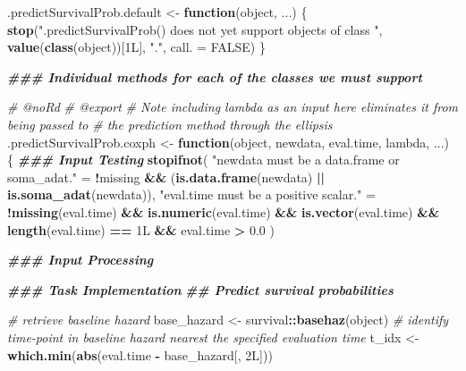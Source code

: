 \documentclass[
]{book}
\newenvironment{Shaded}{\begin{snugshade}}{\end{snugshade}}
\newcommand{\AttributeTok}[1]{\textcolor[rgb]{0.13,0.29,0.53}{#1}}
\newcommand{\CommentTok}[1]{\textcolor[rgb]{0.56,0.35,0.01}{\textit{#1}}}
\newcommand{\ConstantTok}[1]{\textcolor[rgb]{0.56,0.35,0.01}{#1}}
\newcommand{\ControlFlowTok}[1]{\textcolor[rgb]{0.13,0.29,0.53}{\textbf{#1}}}
\newcommand{\DocumentationTok}[1]{\textcolor[rgb]{0.56,0.35,0.01}{\textbf{\textit{#1}}}}
\newcommand{\FloatTok}[1]{\textcolor[rgb]{0.00,0.00,0.81}{#1}}
\newcommand{\FunctionTok}[1]{\textcolor[rgb]{0.13,0.29,0.53}{\textbf{#1}}}
\newcommand{\NormalTok}[1]{#1}
\newcommand{\OtherTok}[1]{\textcolor[rgb]{0.56,0.35,0.01}{#1}}
\newcommand{\SpecialCharTok}[1]{\textcolor[rgb]{0.81,0.36,0.00}{\textbf{#1}}}
\newcommand{\StringTok}[1]{\textcolor[rgb]{0.31,0.60,0.02}{#1}}
\begin{document}
\begin{Shaded}
\begin{Highlighting}[]
\NormalTok{.predictSurvivalProb.default }\OtherTok{\textless{}{-}} \ControlFlowTok{function}\NormalTok{(object, ...) \{}
  \FunctionTok{stop}\NormalTok{(}\StringTok{"\textasciigrave{}.predictSurvivalProb()\textasciigrave{} does not yet support objects of class "}\NormalTok{,}
       \FunctionTok{value}\NormalTok{(}\FunctionTok{class}\NormalTok{(object))[1L], }\StringTok{"."}\NormalTok{, }\AttributeTok{call. =} \ConstantTok{FALSE}\NormalTok{)}
\NormalTok{\}}

\DocumentationTok{\#\#\# Individual methods for each of the classes we must support}

\CommentTok{\#\textquotesingle{} @noRd}
\CommentTok{\#\textquotesingle{} @export}
\CommentTok{\#\textquotesingle{} Note including lambda as an input here eliminates it from being passed to}
\CommentTok{\#\textquotesingle{}   the prediction method through the ellipsis}
\NormalTok{.predictSurvivalProb.coxph }\OtherTok{\textless{}{-}} \ControlFlowTok{function}\NormalTok{(object, newdata, eval.time, lambda, ...) \{}
  \DocumentationTok{\#\#\# Input Testing}
  \FunctionTok{stopifnot}\NormalTok{(}
    \StringTok{"\textasciigrave{}newdata\textasciigrave{} must be a data.frame or soma\_adat."} \OtherTok{=} 
      \SpecialCharTok{!}\NormalTok{missing }\SpecialCharTok{\&\&}\NormalTok{ (}\FunctionTok{is.data.frame}\NormalTok{(newdata) }\SpecialCharTok{||} \FunctionTok{is.soma\_adat}\NormalTok{(newdata)),}
    \StringTok{"\textasciigrave{}eval.time\textasciigrave{} must be a positive scalar."} \OtherTok{=} 
      \SpecialCharTok{!}\FunctionTok{missing}\NormalTok{(eval.time) }\SpecialCharTok{\&\&} \FunctionTok{is.numeric}\NormalTok{(eval.time) }\SpecialCharTok{\&\&} 
        \FunctionTok{is.vector}\NormalTok{(eval.time) }\SpecialCharTok{\&\&} \FunctionTok{length}\NormalTok{(eval.time) }\SpecialCharTok{==}\NormalTok{ 1L }\SpecialCharTok{\&\&}\NormalTok{ eval.time }\SpecialCharTok{\textgreater{}} \FloatTok{0.0}
\NormalTok{  )}
  
  \DocumentationTok{\#\#\# Input Processing}
  
  \DocumentationTok{\#\#\# Task Implementation}
  \DocumentationTok{\#\# Predict survival probabilities}
  
  \CommentTok{\# retrieve baseline hazard}
\NormalTok{  base\_hazard }\OtherTok{\textless{}{-}}\NormalTok{ survival}\SpecialCharTok{::}\FunctionTok{basehaz}\NormalTok{(object)}
  \CommentTok{\# identify time{-}point in baseline hazard nearest the specified evaluation time}
\NormalTok{  t\_idx       }\OtherTok{\textless{}{-}} \FunctionTok{which.min}\NormalTok{(}\FunctionTok{abs}\NormalTok{(eval.time }\SpecialCharTok{{-}}\NormalTok{ base\_hazard[, 2L]))}
  

\end{Highlighting}
\end{Shaded}
\end{document}

